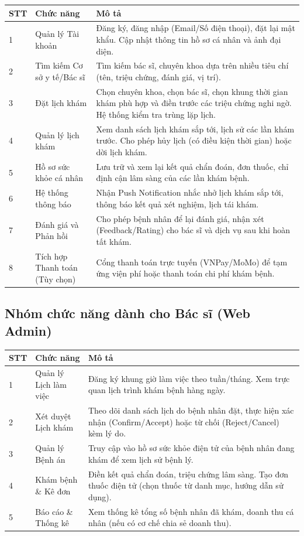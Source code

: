 \documentclass[12pt,a4paper]{article}
\begin{document}
\begin{longtable}{|p{1cm}|p{4.5cm}|p{9.5cm}|}
\hline
\textbf{STT} & \textbf{Chức năng} & \textbf{Mô tả} \\
\hline
\endhead

1 & Quản lý Tài khoản & Đăng ký, đăng nhập (Email/Số điện thoại), đặt lại mật khẩu. Cập nhật thông tin hồ sơ cá nhân và ảnh đại diện. \\
\hline
2 & Tìm kiếm Cơ sở y tế/Bác sĩ & Tìm kiếm bác sĩ, chuyên khoa dựa trên nhiều tiêu chí (tên, triệu chứng, đánh giá, vị trí). \\
\hline
3 & Đặt lịch khám & Chọn chuyên khoa, chọn bác sĩ, chọn khung thời gian khám phù hợp và điền trước các triệu chứng nghi ngờ. Hệ thống kiểm tra trùng lặp lịch. \\
\hline
4 & Quản lý lịch khám & Xem danh sách lịch khám sắp tới, lịch sử các lần khám trước. Cho phép hủy lịch (có điều kiện thời gian) hoặc dời lịch khám. \\
\hline
5 & Hồ sơ sức khỏe cá nhân & Lưu trữ và xem lại kết quả chẩn đoán, đơn thuốc, chỉ định cận lâm sàng của các lần khám bệnh. \\
\hline
6 & Hệ thống thông báo & Nhận Push Notification nhắc nhở lịch khám sắp tới, thông báo kết quả xét nghiệm, lịch tái khám. \\
\hline
7 & Đánh giá và Phản hồi & Cho phép bệnh nhân để lại đánh giá, nhận xét (Feedback/Rating) cho bác sĩ và dịch vụ sau khi hoàn tất khám. \\
\hline
8 & Tích hợp Thanh toán (Tùy chọn) & Cổng thanh toán trực tuyến (VNPay/MoMo) để tạm ứng viện phí hoặc thanh toán chi phí khám bệnh. \\
\hline
\end{longtable}

\subsection{Nhóm chức năng dành cho Bác sĩ (Web Admin)}

\begin{longtable}{|p{1cm}|p{4.5cm}|p{9.5cm}|}
\hline
\textbf{STT} & \textbf{Chức năng} & \textbf{Mô tả} \\
\hline
\endhead

1 & Quản lý Lịch làm việc & Đăng ký khung giờ làm việc theo tuần/tháng. Xem trực quan lịch trình khám bệnh hàng ngày. \\
\hline
2 & Xét duyệt Lịch khám & Theo dõi danh sách lịch do bệnh nhân đặt, thực hiện xác nhận (Confirm/Accept) hoặc từ chối (Reject/Cancel) kèm lý do. \\
\hline
3 & Quản lý Bệnh án & Truy cập vào hồ sơ sức khỏe điện tử của bệnh nhân đang khám để xem lịch sử bệnh lý. \\
\hline
4 & Khám bệnh \& Kê đơn & Điền kết quả chẩn đoán, triệu chứng lâm sàng. Tạo đơn thuốc điện tử (chọn thuốc từ danh mục, hướng dẫn sử dụng). \\
\hline
5 & Báo cáo \& Thống kê & Xem thống kê tổng số bệnh nhân đã khám, doanh thu cá nhân (nếu có cơ chế chia sẻ doanh thu). \\
\hline
\end{longtable}
\end{document}
